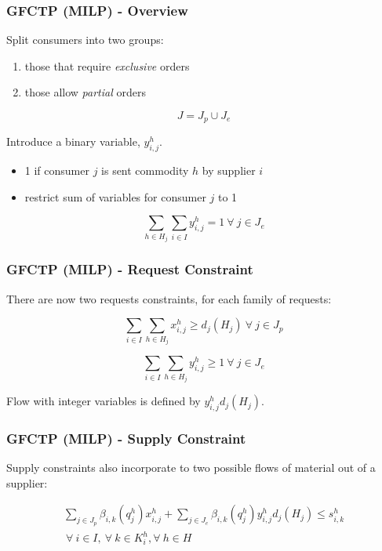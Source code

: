 \begin{frame}[ctb!]
  \frametitle{GFCTP (MILP) - Overview}

  Split consumers into two groups:
  \begin{enumerate}
    \item those that require \textit{exclusive} orders
    \item those allow \textit{partial} orders
  \end{enumerate}

  \begin{equation}\label{eqs:consumer-union}
    J = J_{p} \cup J_{e}
  \end{equation}

  Introduce a binary variable, $y_{i,j}^{h}$.  
  \begin{itemize}
    \item 1 if consumer $j$ is sent commodity $h$ by supplier $i$
    \item restrict sum of variables for consumer $j$ to 1
  \end{itemize}

  \begin{equation}
    \sum_{h \in H_j}\sum_{i \in I}  y_{i,j}^{h} = 1
     \: \forall \: j \in J_{e}
  \end{equation}
  
\end{frame}

\begin{frame}[ctb!]
  \frametitle{GFCTP (MILP) - Request Constraint} 

  There are now two requests constraints, for each family of requests:

  \begin{equation}
    \sum_{i \in I}\sum_{h \in H_{j}} x_{i,j}^{h} \geq d_{j}(H_{j})
     \: \forall \: j \in J_{p}
  \end{equation}
  
  \begin{equation}    
    \sum_{i \in I}\sum_{h \in H_{j}} y_{i,j}^{h} \geq 1
     \: \forall \: j \in J_{e}
  \end{equation}

  Flow with integer variables is defined by $y_{i,j}^{h} d_{j}(H_{j})$.
\end{frame}

\begin{frame}[ctb!]
  \frametitle{GFCTP (MILP) - Supply Constraint} 

  Supply constraints also incorporate to two possible flows of material out of a
  supplier:
  
  \begin{multline}    
    \sum_{j \in J_{p}}\beta_{i,k}(q_{j}^{h}) x_{i,j}^{h}
    + \sum_{j \in J_{e}}\beta_{i,k}(q_{j}^{h}) y_{i,j}^{h} d_{j}(H_{j}) \leq s_{i,k}^{h} \\
     \: \forall \: i \in I, \: \forall \: k \in K_{i}^{h}, \forall \: {h \in H}
  \end{multline}
  
\end{frame}


